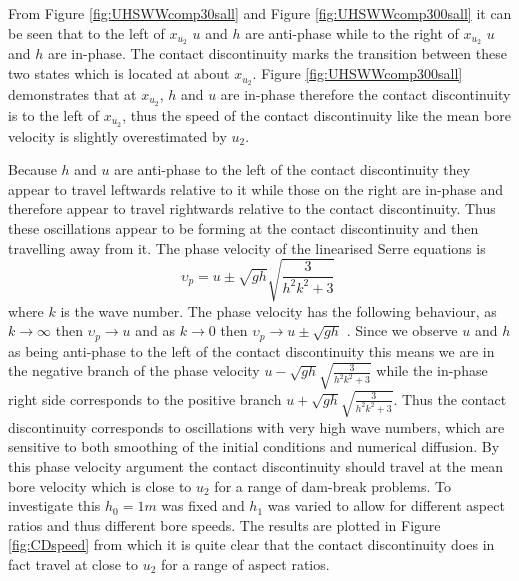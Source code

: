 \documentclass[SingleSpace,12pt,Journal]{Serre_ASCE}
\begin{document}
From Figure \ref{fig:UHSWWcomp30sall} and Figure \ref{fig:UHSWWcomp300sall} it can be seen that to the left of $x_{u_2}$ $u$ and $h$ are anti-phase while to the right of $x_{u_2}$ $u$ and $h$ are in-phase. The contact discontinuity \cite{El-etal-2006} marks the transition between these two states which is located at about $x_{u_2}$. Figure \ref{fig:UHSWWcomp300sall} demonstrates that at $x_{u_2}$, $h$ and $u$ are in-phase therefore the contact discontinuity is to the left of $x_{u_2}$, thus the speed of the contact discontinuity like the mean bore velocity is slightly overestimated by $u_2$. 

Because $h$ and $u$ are anti-phase to the left of the contact discontinuity they appear to travel leftwards relative to it while those on the right are in-phase and therefore appear to travel rightwards relative to the contact discontinuity. Thus these oscillations appear to be forming at the contact discontinuity and then travelling away from it. The phase velocity of the linearised Serre equations is 
\[\upsilon_p = u \pm \sqrt{gh} \sqrt{\frac{3}{h^2 k^2 + 3}} \; \]
where $k$ is the wave number. The phase velocity has the following behaviour, as $k \rightarrow \infty$ then $\upsilon_p \rightarrow u$ and as $k \rightarrow 0$ then $\upsilon_p \rightarrow u \pm \sqrt{gh}$ . Since we observe $u$ and $h$ as being anti-phase to the left of the contact discontinuity this means we are in the negative branch of the phase velocity $u - \sqrt{gh} \sqrt{\frac{3}{h^2 k^2 + 3}}$ while the in-phase right side corresponds to the positive branch  $u + \sqrt{gh} \sqrt{\frac{3}{h^2 k^2 + 3}}$. Thus the contact discontinuity corresponds to oscillations with very high wave numbers, which are sensitive to both smoothing of the initial conditions and numerical diffusion.
By this phase velocity argument the contact discontinuity should travel at the mean bore velocity which is close to $u_2$ for a range of dam-break problems. To investigate this $h_0=1m$ was fixed and $h_1$ was varied to allow for different aspect ratios and thus different bore speeds. The results are plotted in Figure \ref{fig:CDspeed} from which it is quite clear that the contact discontinuity does in fact travel at close to $u_2$ for a range of aspect ratios. 
\end{document}
